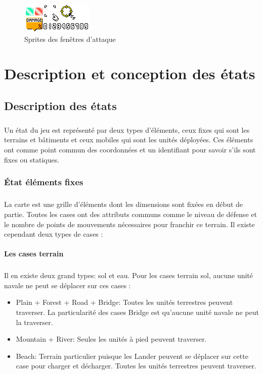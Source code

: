 \documentclass[12pt]{report}
\begin{document}
    \begin{figure}[h]
    \begin{center}
    \includegraphics{advance_wars_sprites_damages.png}
    \end{center}
    \caption{Sprites des fenêtres d'attaque}
    \end{figure}
    
\chapter{Description et conception des états}

\section{Description des états}
\paragraph{}Un état du jeu est représenté par deux types d'éléments, ceux fixes qui sont les terrains et bâtiments et ceux mobiles qui sont les unités déployées. Ces éléments ont comme point commun des coordonnées et un identifiant pour savoir s'ils sont fixes ou statiques.

\subsection{État éléments fixes}
\paragraph{}La carte est une grille d'éléments dont les dimensions sont fixées en début de partie. Toutes les cases ont des attributs communs comme le niveau de défense et le nombre de points de mouvements nécessaires pour franchir ce terrain. Il existe cependant deux types de cases :

\subsubsection{Les cases terrain}
\paragraph{}Il en existe deux grand types: sol et eau. Pour les cases terrain sol, aucune unité navale ne peut se déplacer sur ces cases :
\begin{itemize}
    \item Plain + Forest + Road + Bridge: Toutes les unités terrestres peuvent traverser. La particularité des cases Bridge est qu'aucune unité navale ne peut la traverser.
    \item Mountain + River: Seules les unités à pied peuvent traverser.
    \item Beach: Terrain particulier puisque les Lander peuvent se déplacer sur cette case pour charger et décharger. Toutes les unités terrestres peuvent traverser.
\end{itemize}
\end{document}
